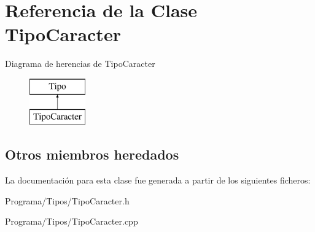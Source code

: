 \hypertarget{class_tipo_caracter}{\section{Referencia de la Clase Tipo\-Caracter}
\label{class_tipo_caracter}
}
Diagrama de herencias de Tipo\-Caracter\begin{figure}[H]
\begin{center}
\leavevmode
\includegraphics[height=2.000000cm]{class_tipo_caracter}
\end{center}
\end{figure}
\subsection*{Otros miembros heredados}


La documentación para esta clase fue generada a partir de los siguientes ficheros\-:\begin{DoxyCompactItemize}
\item 
Programa/\-Tipos/Tipo\-Caracter.\-h\item 
Programa/\-Tipos/Tipo\-Caracter.\-cpp\end{DoxyCompactItemize}
